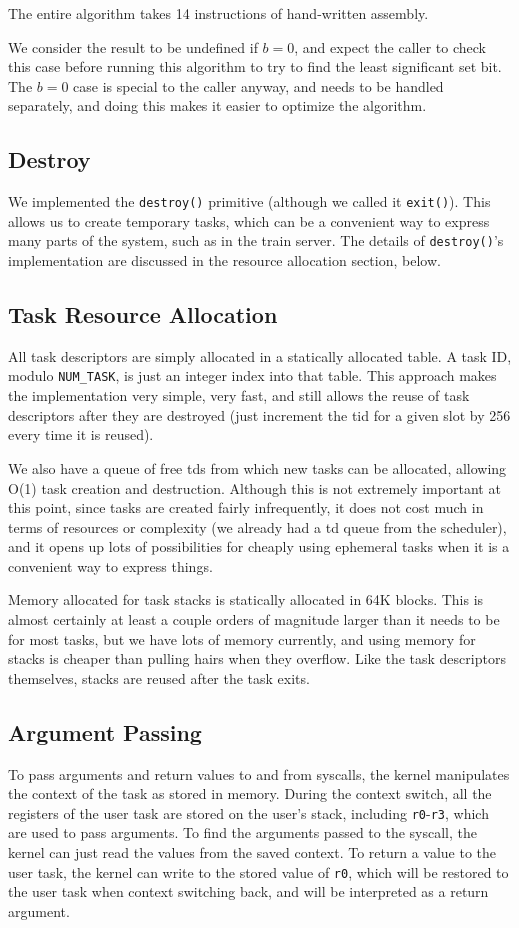 \documentclass[titlepage]{article}
\begin{document}
The entire algorithm takes 14 instructions of hand-written assembly.

We consider the result to be undefined if $b=0$, and expect the caller to check
this case before running this algorithm to try to find the least significant set bit.
The $b=0$ case is special to the caller anyway, and needs to be handled separately,
and doing this makes it easier to optimize the algorithm.

\subsection{Destroy}
We implemented the \texttt{destroy()} primitive (although we called it
\texttt{exit()}).
This allows us to create temporary tasks, which can be a convenient way to
express many parts of the system, such as in the train server. The details of
\texttt{destroy()}'s implementation are discussed in the resource allocation
section, below.

\subsection{Task Resource Allocation}
All task descriptors are simply allocated in a statically allocated table.
A task ID, modulo \texttt{NUM\_TASK}, is just an integer index into that table.
This approach makes the implementation very simple, very fast, and still allows
the reuse of task descriptors after they are destroyed (just increment the tid
for a given slot by 256 every time it is reused).

We also have a queue of free tds from which new tasks can be allocated,
allowing O(1) task creation and destruction. Although this is not extremely
important at this point, since tasks are created fairly infrequently, it does
not cost much in terms of resources or complexity (we already had a td queue
from the scheduler), and it opens up lots of possibilities for cheaply using
ephemeral tasks when it is a convenient way to express things.

Memory allocated for task stacks is statically allocated in 64K blocks. This
is almost certainly at least a couple orders of magnitude larger than it needs
to be for most tasks, but we have lots of memory currently, and using memory
for stacks is cheaper than pulling hairs when they overflow.
Like the task descriptors themselves, stacks are reused after the task exits.

\subsection{Argument Passing}
To pass arguments and return values to and from syscalls, the kernel manipulates
the context of the task as stored in memory.
During the context switch, all the registers of the user task are stored on the
user's stack, including \texttt{r0}-\texttt{r3}, which are used to pass arguments.
To find the arguments passed to the syscall, the kernel can just read the values
from the saved context.
To return a value to the user task, the kernel can write to the stored value of
\texttt{r0}, which will be restored to the user task when context switching back,
and will be interpreted as a return argument.
\end{document}
